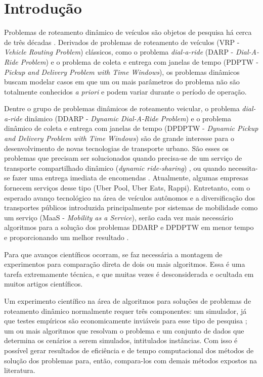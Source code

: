 \chapter{Introdução}\label{ch:introducao}

Problemas de roteamento dinâmico de veículos são objetos de pesquisa há cerca 
de três décadas \cite{psaraftis_dynamic_2015}.
Derivados de problemas de roteamento de veículos (VRP - \textit{Vehicle Routing
Problem}) clássicos, como o problema \textit{dial-a-ride} (DARP -
\textit{Dial-A-Ride Problem}) e o problema de coleta e entrega com
janelas de tempo (PDPTW - \textit{Pickup and Delivery Problem with 
Time Windows}), os problemas dinâmicos buscam modelar casos em que um 
ou mais parâmetros do problema não são totalmente conhecidos 
\textit{a priori} e podem variar durante o período de operação. 

Dentre o grupo de problemas dinâmicos de roteamento veicular, o problema 
\textit{dial-a-ride} dinâmico (DDARP - \textit{Dynamic Dial-A-Ride Problem}) 
\cite{psaraftis_dynamic_1988} e o problema dinâmico de coleta e entrega com
janelas de tempo (DPDPTW - \textit{Dynamic Pickup and Delivery Problem with 
Time Windows}) \cite{dumas_1991} são de grande interesse para o 
desenvolvimento de novas tecnologias de transporte urbano. 
São esses os problemas que precisam ser solucionados quando precisa-se 
de um serviço de transporte compartilhado dinâmico (\textit{dynamic 
ride-sharing}) \cite{agatz_optimization_2012, 
alonso-gonzalez_potential_2018}, ou quando necessita-se 
fazer uma entrega imediata de encomendas \cite{pankratz_dynamic_2005}.
Atualmente, algumas empresas fornecem serviços desse tipo (Uber Pool, Uber
Eats, Rappi).
Entretanto, com o esperado avanço tecnológico na área de veículos
autônomos e a diversificação dos transportes públicos introduzida
principalmente por sistemas de mobilidade como um serviço (MaaS -
\textit{Mobility as a Service}), serão cada vez mais necessário algoritmos 
para a solução dos problemas DDARP e DPDPTW em menor tempo e proporcionando 
um melhor resultado \cite{fulton_three_2017}. 

Para que avanços científicos ocorram, se faz necessária a montagem
de experimentos para comparação direta de dois ou mais algoritmos. 
Essa é uma tarefa extremamente técnica, e que muitas vezes é
desconsiderada e ocultada em muitos artigos científicos.

Um experimento científico na área de algoritmos para soluções de problemas 
de roteamento dinâmico normalmente requer três componentes: um simulador, já 
que testes empíricos são economicamente inviáveis para esse tipo de pesquisa 
\cite{maciejewski_towards_2017}; um ou mais algoritmos que resolvam o problema 
e um conjunto de dados que determina os cenários a serem simulados, intitulados
instâncias.
Com isso é possível gerar resultados de eficiência e de tempo computacional dos
métodos de solução dos problemas para, então, compara-los com demais métodos
expostos na literatura.

